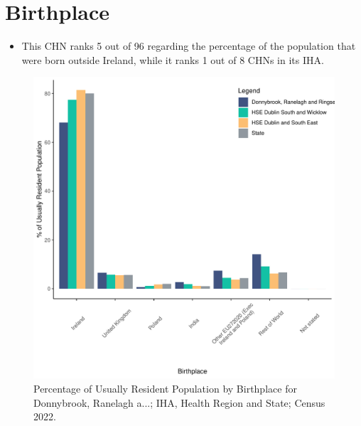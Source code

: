 \documentclass{article}
\begin{document}
\section{Birthplace}\label{sect:Birth}
\begin{itemize}
\item This CHN ranks  5 out of 96 regarding the percentage of the population that were born outside Ireland, while it ranks  1 out of 8 CHNs in its IHA.
\end{itemize}
\begin{figure}[H]
	\centering
	\includegraphics[width = 130mm]{../figures/BirthED.pdf}
	\caption{Percentage of Usually Resident Population by Birthplace for Donnybrook, Ranelagh a...; IHA, Health Region and State; Census 2022.}
	\label{fig:vbnv}
	\end{figure}
	
\end{document}
